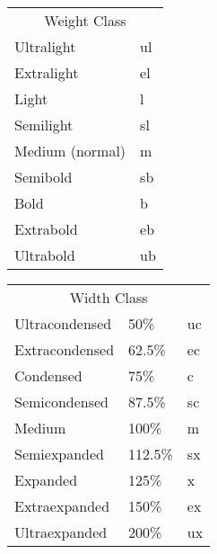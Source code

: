  \begin{table*}
   \begin{center}
     \begin{tabular}{ll}
       \multicolumn{2}{c}{Weight Class} \\[2pt]
       Ultralight     &  ul \\
       Extralight     &  el \\
       Light          &  l  \\
       Semilight      &  sl \\
       Medium (normal)&  m  \\
       Semibold       &  sb \\
       Bold           &  b  \\
       Extrabold      &  eb \\
       Ultrabold      &  ub \\
     \end{tabular}
     \hfil
     \begin{tabular}{lll}
       \multicolumn{3}{c}{Width Class} \\[2pt]
       Ultracondensed  &  50\%    &       uc  \\
       Extracondensed  &  62.5\%  &       ec  \\
       Condensed       &  75\%    &       c   \\
       Semicondensed   &  87.5\%  &       sc  \\
       Medium          &  100\%   &        m  \\
       Semiexpanded    &  112.5\% &       sx  \\
       Expanded        &  125\%   &        x  \\
       Extraexpanded   &  150\%   &       ex  \\
       Ultraexpanded   &  200\%   &       ux
     \end{tabular}
   \end{center}
   \caption{Weight and width classification for fonts.
            The percent values are derived from \protect\cite{IBM}.
            To combine the abbreviations in the {\tt\bslash series}
            command, weight is used first and any instance of medium
            ({\tt m}) is dropped except when weight and width are both
            medium.  In this case one single {\tt m} is used. So bold
            expanded would be {\tt bx} whereas medium expanded would
            be {\tt x}.}
   \label{tab:series}
 \end{table*}
 
